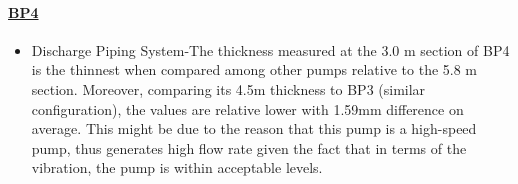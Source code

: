 \paragraph{\underline{BP4}}
\begin{itemize}
	
\item Discharge Piping System-The thickness measured at the 3.0 m section of BP4 is the thinnest when compared among other pumps relative to the 5.8 m section. Moreover, comparing its 4.5m thickness to BP3 (similar configuration), the values are relative lower with 1.59mm difference on average. This might be due to the reason that this pump is a high-speed pump, thus generates high flow rate given the fact that in terms of the vibration, the pump is within acceptable levels.


	
\end{itemize}



	
	
